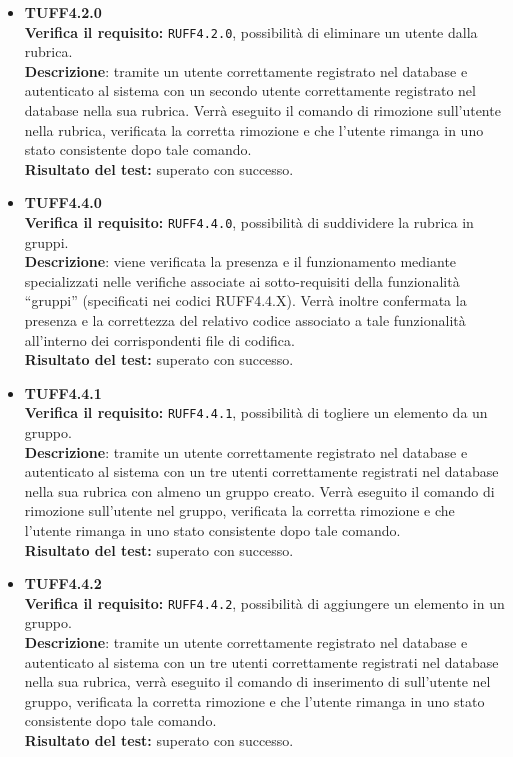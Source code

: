 \begin{itemize}
\item \textbf{TUFF4.2.0}\\
\textbf{Verifica il requisito:} \texttt{RUFF4.2.0}, possibilità di eliminare un utente dalla rubrica.\\
\textbf{Descrizione}: tramite un utente  correttamente registrato nel database e autenticato al sistema con un secondo utente  correttamente registrato nel database nella sua rubrica. Verrà eseguito il comando di rimozione sull'utente nella rubrica, verificata la corretta rimozione e che l'utente rimanga in uno stato consistente dopo tale comando.\\
\textbf{Risultato del test:} superato con successo.

\item \textbf{TUFF4.4.0}\\
\textbf{Verifica il requisito:} \texttt{RUFF4.4.0}, possibilità di suddividere la rubrica in gruppi.\\
\textbf{Descrizione}: viene verificata la presenza e il funzionamento mediante  specializzati nelle verifiche associate ai sotto-requisiti della funzionalità ``gruppi'' (specificati nei codici RUFF4.4.X). Verrà inoltre confermata la presenza e la correttezza del relativo codice associato a tale funzionalità all'interno dei corrispondenti file di codifica.\\
\textbf{Risultato del test:} superato con successo.

\item \textbf{TUFF4.4.1}\\
\textbf{Verifica il requisito:} \texttt{RUFF4.4.1}, possibilità di togliere un elemento da un gruppo.\\
\textbf{Descrizione}: tramite un utente  correttamente registrato nel database e autenticato al sistema con un tre utenti  correttamente registrati nel database nella sua rubrica con almeno un gruppo creato. Verrà eseguito il comando di rimozione sull'utente nel gruppo, verificata la corretta rimozione e che l'utente rimanga in uno stato consistente dopo tale comando.\\
\textbf{Risultato del test:} superato con successo.

\item \textbf{TUFF4.4.2}\\
\textbf{Verifica il requisito:} \texttt{RUFF4.4.2}, possibilità di aggiungere un elemento in un gruppo.\\
\textbf{Descrizione}: tramite un utente  correttamente registrato nel database e autenticato al sistema con un tre utenti  correttamente registrati nel database nella sua rubrica, verrà eseguito il comando di inserimento di sull'utente nel gruppo, verificata la corretta rimozione e che l'utente rimanga in uno stato consistente dopo tale comando.\\
\textbf{Risultato del test:} superato con successo.


\end{itemize}
